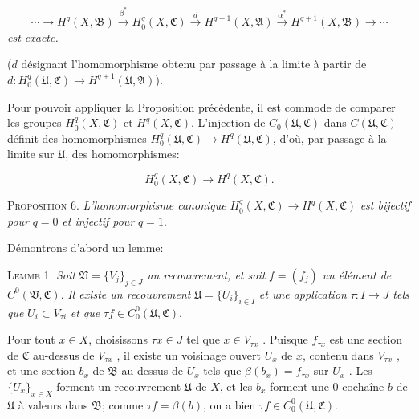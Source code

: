 \begin{equation*}
\cdots \longrightarrow H^q(X, \mathfrak{B}) \overset{\beta^*}{\longrightarrow} H_0^q(X, \mathfrak{C}) \overset{d}{\longrightarrow} H^{q+1}(X, \mathfrak{A}) \overset{\alpha^*}{\longrightarrow} H^{q+1}(X, \mathfrak{B}) \longrightarrow \cdots
\end{equation*}
\textit{est exacte.}

($d$ désignant l'homomorphisme obtenu par passage à la limite à partir de $d: H_0^q(\mathfrak{U}, \mathfrak{C}) \rightarrow H^{q+1}(\mathfrak{U}, \mathfrak{A})$).

Pour pouvoir appliquer la Proposition précédente, il est commode de comparer les groupes $H_0^q(X, \mathfrak{C})$ et $H^q(X, \mathfrak{C})$. L'injection de $C_0(\mathfrak{U}, \mathfrak{C})$ dans $C(\mathfrak{U}, \mathfrak{C})$ définit des homomorphismes $H_0^q(\mathfrak{U}, \mathfrak{C}) \rightarrow H^q(\mathfrak{U}, \mathfrak{C})$, d'où, par passage à la limite sur $\mathfrak{U}$, des homomorphismes:

\begin{equation*}
H_0^q(X, \mathfrak{C}) \longrightarrow H^q(X, \mathfrak{C}).
\end{equation*}

\textsc{Proposition} 6. \textit{L'homomorphisme canonique} $H_0^q(X, \mathfrak{C}) \rightarrow H^q(X, \mathfrak{C})$ \textit{est bijectif pour} $q = 0$ \textit{et injectif pour} $q = 1$.

Démontrons d'abord un lemme:

\textsc{Lemme} 1. \textit{Soit} $\mathfrak{V} = \{V_j\}_{j \in J}$ \textit{un recouvrement, et soit} $f = (f_j)$ \textit{un élément de} $C^0(\mathfrak{V}, \mathfrak{C})$. \textit{Il existe un recouvrement} $\mathfrak{U} = \{U_i\}_{i \in I}$ \textit{et une application} $\tau: I \rightarrow J$ \textit{tels que} $U_i \subset V_{\tau i}$ \textit{et que} $\tau f \in C_0^0(\mathfrak{U}, \mathfrak{C})$.

Pour tout $x \in X$, choisissons $\tau x \in J$ tel que $x \in V_{\tau x}$ . Puisque $f_{\tau x}$ est une section de $\mathfrak{C}$ au-dessus de $V_{\tau x}$ , il existe un voisinage ouvert $U_x$ de $x$, contenu dans $V_{\tau x}$ , et une section $b_x$ de $\mathfrak{B}$ au-dessus de $U_x$ tels que $\beta(b_x) = f_{\tau x}$ sur $U_x$ . Les $\{U_x\}_{x \in X}$ forment un recouvrement $\mathfrak{U}$ de $X$, et les $b_x$ forment une 0-cochaîne $b$ de $\mathfrak{U}$ à valeurs dans $\mathfrak{B}$; comme $\tau f = \beta(b)$, on a bien $\tau f \in C_0^0(\mathfrak{U}, \mathfrak{C})$.

